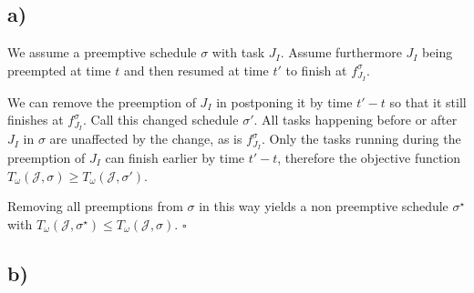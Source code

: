 \documentclass[12pt]{article}
\begin{document}
\subsection*{a)}
We assume a preemptive schedule $\sigma$ with task $J_I$. Assume furthermore $J_I$ being preempted at time $t$ and then resumed at time $t'$ to finish at $f^\sigma_{J_I}$. 

We can remove the preemption of $J_I$ in postponing it by time $t' - t$ so that it still finishes at $f^\sigma_{J_I}$. Call this changed schedule $\sigma'$. All tasks happening before or after $J_I$ in $\sigma$ are unaffected by the change, as is $f^\sigma_{J_I}$. 
Only the tasks running during the preemption of $J_I$ can finish earlier by time $t' - t$, therefore the objective function $T_\omega (\mathcal{J}, \sigma) \geq T_\omega (\mathcal{J}, \sigma')$. 

Removing all preemptions from $\sigma$ in this way yields a non preemptive schedule $\sigma^\star$ with $T_\omega (\mathcal{J}, \sigma^\star) \leq T_\omega (\mathcal{J}, \sigma)$. $\square$

\subsection*{b)}
\end{document}
